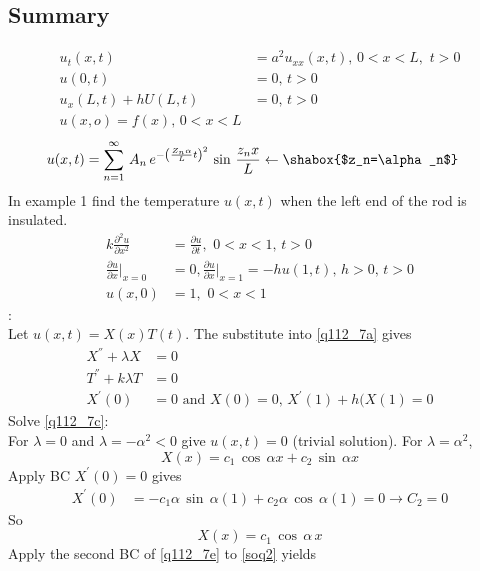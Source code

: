 \subsection{Summary}
\begin{align}
u_t(x,t)&=a^2u_{xx}(x,t),\,0<x<L,\,\,t>0\\
u(0,t)&=0,\,t>0\\
u_x(L,t)+hU(L,t)&=0,\,t>0\\
u(x,o)=f(x),\,0<x<L
\end{align}
\begin{align*}
u(x,t)&=\sum_{n=1}^\infty\,A_n\,e^{-\left(\frac{Z_n\alpha}{L}t\right)^2}\,\sin\,\frac{z_n x}{L}\leftarrow\shabox{$z_n=\alpha_n$}
\end{align*}
In example 1 find the temperature $u(x,t)$ when the left end of the rod is insulated.
\begin{align}
k\frac{\partial^2 u}{\partial x^2}&=\frac{\partial u}{\partial t},\,\,0<x<1,\,t>0\label{q112_7a}\\
\frac{\partial u}{\partial x}\big|_{x=0}&=0,\frac{\partial u}{\partial x}\big|_{x=1}=-hu(1,t),\,h>0,\,t>0\label{q112_7b}\\
u(x,0)&=1,\,\,0<x<1\label{q112_7b}
\end{align}
:\\
Let $u(x,t)=X(x)T(t)$. The substitute into \eqref{q112_7a} gives
\begin{align}
X^{''}+\lambda X&=0\label{q112_7c}\\
T^{''}+k\lambda T&=0\label{q112_7d}\\
X^{'}(0)&=0\,\,\text{and}\,\,X(0)=0,\,X^{'}(1)+h(X(1)=0\label{q112_7e}
\end{align}
Solve \eqref{q112_7c}:\\ 
For $\lambda=0$ and $\lambda=-\alpha^2<0$ give $u(x,t)=0$ (trivial solution). For $\lambda=\alpha^2$, 
\begin{equation}
X(x)=c_1\, \cos\,\alpha x+c_2\,\sin\,\alpha x\label{soq1}
\end{equation}
Apply BC $X^{'}(0)=0$ gives\\
\begin{align*}
X^{'}(0)&=-c_1\alpha\,\sin\,\alpha(1)+c_2\alpha\,\cos\,\alpha(1)=0\to C_2=0 
\end{align*}
So 
\begin{equation}
X(x)=c_1\,\cos\,\alpha\,x\label{soq2}
\end{equation}
Apply the second BC of \eqref{q112_7e} to \eqref{soq2} yields
